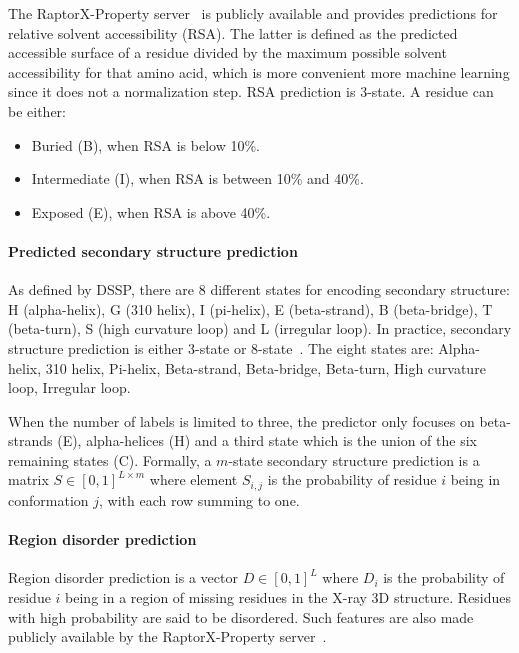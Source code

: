             The RaptorX-Property server~\cite{wang2016raptorx} is publicly available and provides
            predictions for relative solvent accessibility (RSA). The latter is defined as the predicted
            accessible surface of a residue divided by the maximum possible solvent accessibility
            for that amino acid, which is more convenient more machine learning since it does not a
            normalization step. RSA prediction is 3-state. A residue can be either:
            \begin{itemize}
                \item Buried (B), when RSA is below 10\%.
                \item Intermediate (I), when RSA is between 10\% and 40\%.
                \item Exposed (E), when RSA is above 40\%.
            \end{itemize}


        \paragraph{Predicted secondary structure prediction}

            As defined by DSSP, there are 8 different states for encoding
            secondary structure: H (alpha-helix),
            G (310 helix), I (pi-helix), E (beta-strand), B (beta-bridge),
            T (beta-turn), S (high curvature loop) and L (irregular loop).
            In practice, secondary structure prediction is either 3-state
            or 8-state~\cite{wang2016raptorx}.
            The eight states are: Alpha-helix, 310 helix, Pi-helix, Beta-strand,
            Beta-bridge, Beta-turn, High curvature loop, Irregular loop.

            When the number of labels is limited to three,
            the predictor only focuses on beta-strands (E), alpha-helices (H)
            and a third state which is the union of the six remaining states (C).
            Formally, a $m$-state secondary structure prediction is a matrix
            $S \in [0, 1]^{L \times m}$ where element $S_{i,j}$ is the probability
            of residue $i$ being in conformation $j$,
            with each row summing to one.

        \paragraph{Region disorder prediction}

            Region disorder prediction is a vector $D \in [0, 1]^L$
            where $D_i$ is the probability of residue $i$ being in a region
            of missing residues in the X-ray 3D structure. Residues with high
            probability are said to be disordered.
            Such features are also made publicly available by the 
            RaptorX-Property server~\cite{wang2016raptorx}.

